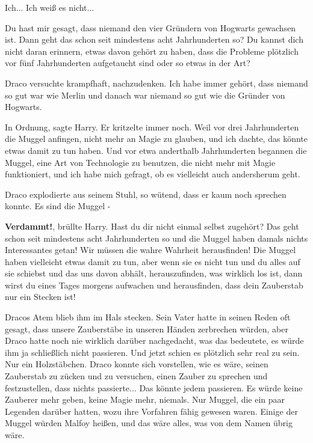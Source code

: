 \glqq Ich... Ich weiß es nicht...\grqq{}

\glqq Du hast mir gesagt, dass niemand den vier Gründern von Hogwarts gewachsen
ist. Dann geht das schon seit mindestens acht Jahrhunderten so? Du kannst dich
nicht daran erinnern, etwas davon gehört zu haben, dass die Probleme plötzlich
vor fünf Jahrhunderten aufgetaucht sind oder so etwas in der Art?\grqq{}

Draco versuchte krampfhaft, nachzudenken. \glqq Ich habe immer gehört, dass
niemand so gut war wie Merlin und danach war niemand so gut wie die Gründer von
Hogwarts.\grqq{}

\glqq In Ordnung\grqq{}, sagte Harry. Er kritzelte immer noch. \glqq Weil vor
drei Jahrhunderten die Muggel anfingen, nicht mehr an Magie zu glauben, und ich
dachte, das könnte etwas damit zu tun haben. Und vor etwa anderthalb
Jahrhunderten begannen die Muggel, eine Art von Technologie zu benutzen, die
nicht mehr mit Magie funktioniert, und ich habe mich gefragt, ob es vielleicht
auch andersherum geht.\grqq{}

Draco explodierte aus seinem Stuhl, so wütend, dass er kaum noch sprechen
konnte. \glqq Es sind die Muggel -\grqq{}

\textbf{\glqq Verdammt!\grqq{}}, brüllte Harry. \glqq Hast du dir nicht einmal
selbst zugehört? Das geht schon seit mindestens acht Jahrhunderten so und die
Muggel haben damals nichts Interessantes getan! Wir müssen die wahre Wahrheit
herausfinden! Die Muggel haben vielleicht etwas damit zu tun, aber wenn sie es
nicht tun und du alles auf sie schiebst und das uns davon abhält,
herauszufinden, was wirklich los ist, dann wirst du eines Tages morgens
aufwachen und herausfinden, dass dein Zauberstab nur ein Stecken ist!\grqq{}

Dracos Atem blieb ihm im Hals stecken. Sein Vater hatte in seinen Reden oft
gesagt, dass unsere Zauberstäbe in unseren Händen zerbrechen würden, aber Draco
hatte noch nie wirklich darüber nachgedacht, was das bedeutete, es würde ihm ja
schließlich nicht passieren. Und jetzt schien es plötzlich sehr real zu sein.
Nur ein Holzstäbchen. Draco konnte sich vorstellen, wie es wäre, seinen
Zauberstab zu zücken und zu versuchen, einen Zauber zu sprechen und
festzustellen, dass nichts passierte... Das könnte jedem passieren. Es würde
keine Zauberer mehr geben, keine Magie mehr, niemals. Nur Muggel, die ein paar
Legenden darüber hatten, wozu ihre Vorfahren fähig gewesen waren. Einige der
Muggel würden Malfoy heißen, und das wäre alles, was von dem Namen übrig wäre.


